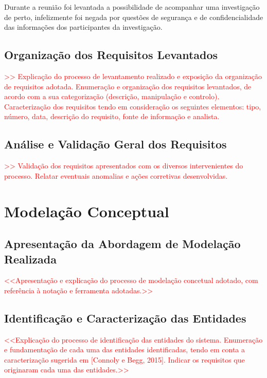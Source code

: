 \documentclass[a4paper,12pt]{scrreprt}
\begin{document}
            \par Durante a reunião foi levantada a possibilidade de acompanhar uma investigação de perto, infelizmente foi negada por questões de segurança e de confidencialidade das informações dos participantes da investigação. 

            
    \section{Organização dos Requisitos Levantados}
        \textcolor{red}{
            >> Explicação do processo de levantamento realizado e exposição da organização de requisitos adotada. Enumeração e organização dos requisitos levantados, de acordo com a sua categorização (descrição, manipulação e controlo). Caracterização dos requisitos tendo em consideração os seguintes elementos: tipo, número, data, descrição do requisito, fonte de informação e analista.
        }
    \section{Análise e Validação Geral dos Requisitos}
        \textcolor{red}{
            >> Validação dos requisitos apresentados com os diversos intervenientes do processo. Relatar eventuais anomalias e ações corretivas desenvolvidas.
        }



\chapter{Modelação Conceptual}
    \section{Apresentação da Abordagem de Modelação Realizada}
        \textcolor{red}{
            <<Apresentação e explicação do processo de modelação concetual adotado, com referência à notação e ferramenta adotadas.>>
        }
    \section{Identificação e Caracterização das Entidades}
        \textcolor{red}{
            <<Explicação do processo de identificação das entidades do sistema. Enumeração e fundamentação de cada uma das entidades identificadas, tendo em conta a caracterização sugerida em [Connoly e Begg, 2015]. Indicar os requisitos que originaram cada uma das entidades.>>
        }
\end{document}
